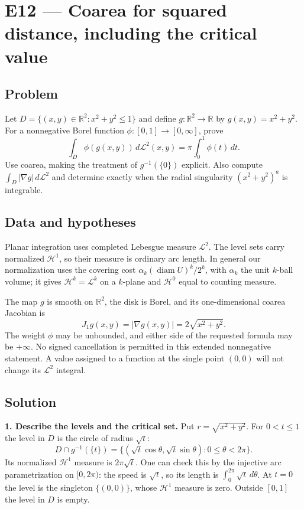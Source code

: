 \documentclass[
  11pt,
]{article}
\begin{document}
\section{E12 --- Coarea for squared distance, including the critical
value}\label{E12}

\subsection{Problem}\label{problem-11}

Let \(D=\{(x,y)\in\mathbb R^2:x^2+y^2\leq1\}\) and define
\(g:\mathbb R^2\to\mathbb R\) by \(g(x,y)=x^2+y^2\). For a nonnegative
Borel function \(\phi:[0,1]\to[0,\infty]\), prove \[
\int_D\phi(g(x,y))\,d\mathcal L^2(x,y)
=\pi\int_0^1\phi(t)\,dt.
\] Use coarea, making the treatment of \(g^{-1}(\{0\})\) explicit. Also
compute \(\int_D|\nabla g|\,d\mathcal L^2\) and determine exactly when
the radial singularity \((x^2+y^2)^a\) is integrable.

\subsection{Data and hypotheses}\label{data-and-hypotheses-11}

Planar integration uses completed Lebesgue measure \(\mathcal L^2\). The
level sets carry normalized \(\mathcal H^1\), so their measure is
ordinary arc length. In general our normalization uses the covering cost
\(\alpha_k(\operatorname{diam}U)^k/2^k\), with \(\alpha_k\) the unit
\(k\)-ball volume; it gives \(\mathcal H^k=\mathcal L^k\) on a
\(k\)-plane and \(\mathcal H^0\) equal to counting measure.

The map \(g\) is smooth on \(\mathbb R^2\), the disk is Borel, and its
one-dimensional coarea Jacobian is \[
J_1g(x,y)=|\nabla g(x,y)|=2\sqrt{x^2+y^2}.
\] The weight \(\phi\) may be unbounded, and either side of the
requested formula may be \(+\infty\). No signed cancellation is
permitted in this extended nonnegative statement. A value assigned to a
function at the single point \((0,0)\) will not change its
\(\mathcal L^2\) integral.

\subsection{Solution}\label{solution-11}

\textbf{1. Describe the levels and the critical set.} Put
\(r=\sqrt{x^2+y^2}\). For \(0<t\leq1\) the level in \(D\) is the circle
of radius \(\sqrt t\): \[
D\cap g^{-1}(\{t\})=\{(\sqrt t\cos\theta,\sqrt t\sin\theta):0\leq\theta<2\pi\}.
\] Its normalized \(\mathcal H^1\) measure is \(2\pi\sqrt t\). One can
check this by the injective arc parametrization on \([0,2\pi)\): the
speed is \(\sqrt t\), so its length is
\(\int_0^{2\pi}\sqrt t\,d\theta\). At \(t=0\) the level is the singleton
\(\{(0,0)\}\), whose \(\mathcal H^1\) measure is zero. Outside \([0,1]\)
the level in \(D\) is empty.
\end{document}
